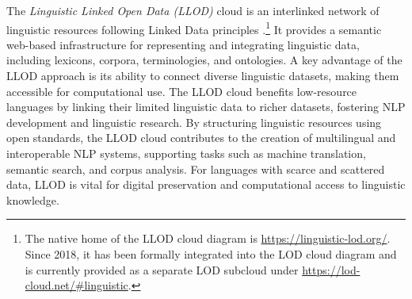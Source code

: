 The \emph{Linguistic Linked Open Data (LLOD)} cloud \cite{chiarcos2011towards,pareja2019development,cimiano2020linguistic} is an interlinked network of linguistic resources following Linked Data principles \cite{bizer2009linked}.\footnote{
    The native home of the LLOD cloud diagram is \url{https://linguistic-lod.org/}. Since 2018, it has been formally integrated into the LOD cloud diagram and is currently provided as a separate LOD subcloud under \url{https://lod-cloud.net/\#linguistic}.
} 
It provides a semantic web-based infrastructure for representing and integrating linguistic data, including lexicons, corpora, terminologies, and ontologies.
A key advantage of the LLOD approach is its ability to connect diverse linguistic datasets, making them accessible for computational use. 
The LLOD cloud benefits low-resource languages by linking their limited linguistic data to richer datasets, fostering NLP development and linguistic research. By structuring linguistic resources using open standards, the LLOD cloud contributes to the creation of multilingual and interoperable NLP systems, supporting tasks such as machine translation, semantic search, and corpus analysis. For languages with scarce and scattered data, LLOD is vital for digital preservation and computational access to linguistic knowledge. 


